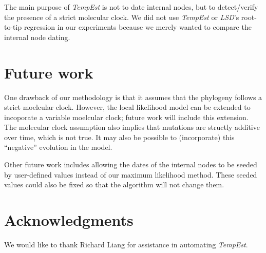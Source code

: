 \documentclass[12pt]{article}
\begin{document}
The main purpose of \emph{TempEst} is not to date internal nodes, but to detect/verify the presence of a strict molecular clock.
We did not use \emph{TempEst} or \emph{LSD}'s root-to-tip regression in our experiments because we merely wanted to compare the internal node dating.

\section*{Future work} \label{sec:discuss}
One drawback of our methodology is that it assumes that the phylogeny follows a strict moelcular clock. However, the local likelihood model can be extended to incoporate a variable moelcular clock; future work will include this extension. The molecular clock assumption also implies that mutations are structly additive over time, which is not true. It may also be possible to (incorporate) this ``negative'' evolution in the model.

Other future work includes allowing the dates of the internal nodes to be seeded by user-defined values instead of our maximum likelihood method. These seeded values could also be fixed so that the algorithm will not change them.

\section*{Acknowledgments} \label{sec:ackn}
We would like to thank Richard Liang for assistance in automating \emph{TempEst}.

\clearpage





\clearpage

\end{document}
